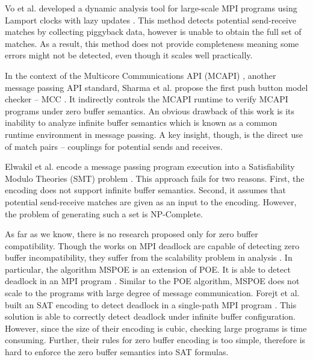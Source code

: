 Vo et al. developed a dynamic analysis tool for large-scale MPI programs using Lamport clocks with lazy updates \cite{DBLP:conf/sc/VoAGSSB10, DBLP:conf/IEEEpact/VoGKSSB11}. This method detects potential send-receive matches by collecting piggyback data, however is unable to obtain the full set of matches. As a result, this method does not provide completeness meaning some errors might not be detected, even though it scales well practically.

In the context of the Multicore Communications API (MCAPI) \cite{mcapi}, another message passing API standard, Sharma et al. propose the first push button model checker -- MCC \cite{DBLP:conf/fmcad/SharmaGMH09}. It indirectly controls the MCAPI runtime to verify MCAPI programs under zero buffer semantics. An obvious drawback of this work is its inability to analyze infinite buffer semantics which is known as a common runtime environment in message passing. A key insight, though, is the direct use of match pairs -- couplings for potential sends and receives.

Elwakil et al. encode a message passing program execution into a Satisfiability Modulo Theories (SMT) problem  \cite{barrett2008satisfiability} \cite{DBLP:conf/issta/ElwakilY10, DBLP:conf/atva/ElwakilYW10}. This approach fails for two reasons. First, the encoding does not support infinite buffer semantics. Second, it assumes that potential send-receive matches are given as an input to the encoding. However, the problem of generating such a set is NP-Complete.

As far as we know, there is no research proposed only for zero buffer compatibility. Though the works on MPI deadlock are capable of detecting zero buffer incompatibility, they suffer from the scalability problem in analysis \cite{}. In particular, the algorithm MSPOE is an extension of POE. It is able to detect deadlock in an MPI program \cite{}. Similar to the POE algorithm, MSPOE does not scale to the programs with large degree of message communication. Forejt et al. built an SAT encoding to detect deadlock in a single-path MPI program \cite{}. This solution is able to correctly detect deadlock under infinite buffer configuration. However, since the size of their encoding is cubic, checking large programs is time consuming. Further, their rules for zero buffer encoding is too simple, therefore is hard to enforce the zero buffer semantics into SAT formulas. 

